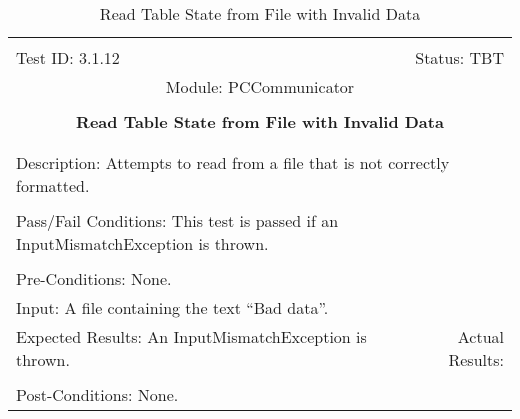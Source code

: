 \documentclass[titlepage]{article}
\begin{document}
\begin{center}%
\begin{table}[h!]
\begin{tabular}{|l r|}\hline&\\[-2mm]
	Test ID: 3.1.12	&Status: TBT\\[-3mm]
	\multicolumn{2}{|c|}{Module: PCCommunicator}\\&\\
	\multicolumn{2}{|c|}{\textbf{\large{Read Table State from File with Invalid Data}}}\\&\\\hline&\\[-3mm]
	\multicolumn{2}{|p{\textwidth}|}{Description: Attempts to read from a file that is not correctly formatted.}\\[1mm]\hline&\\[-3mm]
	\multicolumn{2}{|p{\textwidth}|}{Pass/Fail Conditions: This test is passed if an InputMismatchException is thrown.}\\[1mm]\hline&\\[-3mm]
	\multicolumn{2}{|p{\textwidth}|}{Pre-Conditions: None.}\\[4mm]
	\multicolumn{2}{|p{\textwidth}|}{Input: A file containing the text ``Bad data''.}\\[2mm]\hline
	\multicolumn{1}{|p{0.49\textwidth}}{Expected Results: An InputMismatchException is thrown.}	&\multicolumn{1}{|p{0.45\textwidth}|}{Actual Results: }\\\hline&\\[-3mm]
	\multicolumn{2}{|p{\textwidth}|}{Post-Conditions: None.}\\\hline
\end{tabular}
\caption{Read Table State from File with Invalid Data}
\end{table}
\end{center}
\end{document}
